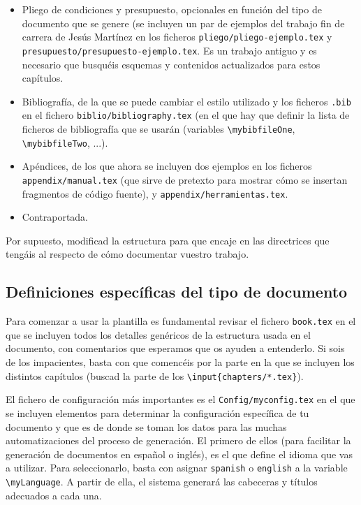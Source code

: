 \documentclass[spanish,openright]{book}
\begin{document}
\begin{itemize}
\item Pliego de condiciones y presupuesto, opcionales en función del
tipo de documento que se genere (se incluyen un
par de ejemplos del trabajo fin de carrera de Jesús Martínez en los
ficheros \texttt{pliego/pliego-ejemplo.tex} y
\texttt{presupuesto/presupuesto-ejemplo.tex}. Es un trabajo antiguo y
es necesario que busquéis esquemas y contenidos actualizados para
estos capítulos.

\item Bibliografía, de la que se puede cambiar el estilo utilizado y los
ficheros \texttt{.bib} en el fichero
\texttt{biblio/bibliography.tex} (en el que hay que definir la lista
de ficheros de bibliografía que se usarán (variables
\texttt{\textbackslash{}mybibfileOne},
\texttt{\textbackslash{}mybibfileTwo}, ...).

\item Apéndices, de los que ahora se incluyen dos ejemplos en los
ficheros \texttt{appendix/manual.tex} (que sirve de pretexto para
mostrar cómo se insertan fragmentos de código fuente), y
\texttt{appendix/herramientas.tex}.
\item Contraportada.
\end{itemize}

Por supuesto, modificad la estructura para que encaje en las directrices
que tengáis al respecto de cómo documentar vuestro trabajo.


\subsection{Definiciones específicas del tipo de documento}
\label{sec:definicion-del-tipo}

Para comenzar a usar la plantilla es fundamental revisar el fichero
\texttt{book.tex} en el que se incluyen todos los detalles genéricos de
la estructura usada en el documento, con comentarios que esperamos que
os ayuden a entenderlo. Si sois de los impacientes, basta con que
comencéis por la parte en la que se incluyen los distintos capítulos
(buscad la parte de los \texttt{\textbackslash{}input\{chapters/*.tex\}}).

El fichero de configuración más importantes es el
\texttt{Config/myconfig.tex} en el que se incluyen elementos para
determinar la configuración específica de tu documento y que es de
donde se toman los datos para las muchas automatizaciones del proceso
de generación. El primero de ellos (para facilitar la generación de
documentos en español o inglés), es el que define el idioma que vas a
utilizar. Para seleccionarlo, basta con asignar \texttt{spanish} o
\texttt{english} a la variable \texttt{\textbackslash{}myLanguage}. A
partir de ella, el sistema generará las cabeceras y títulos adecuados
a cada una.
\end{document}
